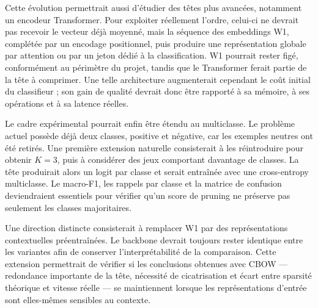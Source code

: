 Cette évolution permettrait aussi d'étudier des têtes plus avancées, notamment
un encodeur Transformer. Pour exploiter réellement l'ordre, celui-ci ne devrait
pas recevoir le vecteur déjà moyenné, mais la séquence des embeddings W1,
complétée par un encodage positionnel, puis produire une représentation globale
par attention ou par un jeton dédié à la classification. W1 pourrait rester
figé, conformément au périmètre du projet, tandis que le Transformer ferait
partie de la tête à comprimer. Une telle architecture augmenterait cependant
le coût initial du classifieur ; son gain de qualité devrait donc être rapporté
à sa mémoire, à ses opérations et à sa latence réelles.

Le cadre expérimental pourrait enfin être étendu au multiclasse. Le problème
actuel possède déjà deux classes, positive et négative, car les exemples neutres
ont été retirés. Une première extension naturelle consisterait à les réintroduire
pour obtenir $K=3$, puis à considérer des jeux comportant davantage de classes.
La tête produirait alors un logit par classe et serait entraînée avec une
cross-entropy multiclasse. Le macro-F1, les rappels par classe et la matrice de
confusion deviendraient essentiels pour vérifier qu'un score de pruning ne
préserve pas seulement les classes majoritaires.

Une direction distincte consisterait à remplacer W1 par des représentations
contextuelles préentraînées. Le backbone devrait toujours rester identique entre
les variantes afin de conserver l'interprétabilité de la comparaison. Cette
extension permettrait de vérifier si les conclusions obtenues avec CBOW ---
redondance importante de la tête, nécessité de cicatrisation et écart entre
sparsité théorique et vitesse réelle --- se maintiennent lorsque les
représentations d'entrée sont elles-mêmes sensibles au contexte.
